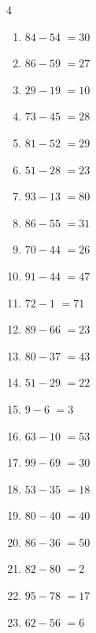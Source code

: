 \begin{multicols}{4}
\begin{enumerate}
  \item $84-54$
        $=30$

  \item $86-59$
        $=27$

  \item $29-19$
        $=10$

\columnbreak %

\resetques

  \item $73-45$
        $=28$

  \item $81-52$
        $=29$

  \item $51-28$
        $=23$

  \item $93-13$
        $=80$

  \item $86-55$
        $=31$

  \item $70-44$
        $=26$

  \item $91-44$
        $=47$

  \item $72-1$
        $=71$

  \item $89-66$
        $=23$

  \item $80-37$
        $=43$

  \item $51-29$
        $=22$

  \item $9-6$
        $=3$

  \item $63-10$
        $=53$

  \item $99-69$
        $=30$

  \item $53-35$
        $=18$

  \item $80-40$
        $=40$

  \item $86-36$
        $=50$

  \item $82-80$
        $=2$

  \item $95-78$
        $=17$

  \item $62-56$
        $=6$


\end{enumerate}
\end{multicols}
